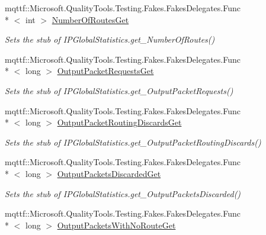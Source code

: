 \begin{DoxyCompactItemize}
mqttf\-::\-Microsoft.\-Quality\-Tools.\-Testing.\-Fakes.\-Fakes\-Delegates.\-Func\\*
$<$ int $>$ \hyperlink{class_system_1_1_net_1_1_network_information_1_1_fakes_1_1_stub_i_p_global_statistics_a41f005333b80c5855b2ce71c2a368b90}{Number\-Of\-Routes\-Get}
\begin{DoxyCompactList}\small\item\em Sets the stub of I\-P\-Global\-Statistics.\-get\-\_\-\-Number\-Of\-Routes()\end{DoxyCompactList}\item 
mqttf\-::\-Microsoft.\-Quality\-Tools.\-Testing.\-Fakes.\-Fakes\-Delegates.\-Func\\*
$<$ long $>$ \hyperlink{class_system_1_1_net_1_1_network_information_1_1_fakes_1_1_stub_i_p_global_statistics_aa68c5a6d3c8467a233a9c842b595a165}{Output\-Packet\-Requests\-Get}
\begin{DoxyCompactList}\small\item\em Sets the stub of I\-P\-Global\-Statistics.\-get\-\_\-\-Output\-Packet\-Requests()\end{DoxyCompactList}\item 
mqttf\-::\-Microsoft.\-Quality\-Tools.\-Testing.\-Fakes.\-Fakes\-Delegates.\-Func\\*
$<$ long $>$ \hyperlink{class_system_1_1_net_1_1_network_information_1_1_fakes_1_1_stub_i_p_global_statistics_a1acf450e4f62b6642ec5da9b5a39b25c}{Output\-Packet\-Routing\-Discards\-Get}
\begin{DoxyCompactList}\small\item\em Sets the stub of I\-P\-Global\-Statistics.\-get\-\_\-\-Output\-Packet\-Routing\-Discards()\end{DoxyCompactList}\item 
mqttf\-::\-Microsoft.\-Quality\-Tools.\-Testing.\-Fakes.\-Fakes\-Delegates.\-Func\\*
$<$ long $>$ \hyperlink{class_system_1_1_net_1_1_network_information_1_1_fakes_1_1_stub_i_p_global_statistics_a3112f50a36e2bcfebdfe3673b36436fe}{Output\-Packets\-Discarded\-Get}
\begin{DoxyCompactList}\small\item\em Sets the stub of I\-P\-Global\-Statistics.\-get\-\_\-\-Output\-Packets\-Discarded()\end{DoxyCompactList}\item 
mqttf\-::\-Microsoft.\-Quality\-Tools.\-Testing.\-Fakes.\-Fakes\-Delegates.\-Func\\*
$<$ long $>$ \hyperlink{class_system_1_1_net_1_1_network_information_1_1_fakes_1_1_stub_i_p_global_statistics_a7fbf35252b775ae0488f7b39ceb08b0e}{Output\-Packets\-With\-No\-Route\-Get}

\end{DoxyCompactItemize}
